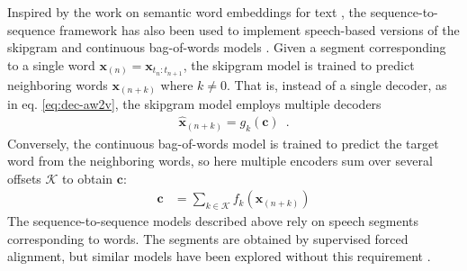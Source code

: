 
%

Inspired by the work on semantic word embeddings for text \cite{mikolov2013distributed}, the sequence-to-sequence framework has also been used to implement speech-based versions of the skipgram and continuous bag-of-words models \cite{chung2017learning, chung2018speech2vec}. Given a segment corresponding to a single word $\mathbf{x}_{(n)} = \mathbf{x}_{t_{n}:t_{n+1}}$, the skipgram model is trained to predict neighboring words $\mathbf{x}_{(n + k)}$ where $k\ne0$. That is, instead of a single decoder, as in eq. \ref{eq:dec-aw2v}, the skipgram model employs multiple decoders
%
\begin{align}
    \hat{\mathbf{x}}_{(n + k)} = g_k(\mathbf{c})\enspace.
\end{align}
%
Conversely, the continuous bag-of-words model is trained to predict the target word from the neighboring words, so here multiple encoders sum over several offsets $\mathcal{K}$ to obtain $\mathbf{c}$:
%
\begin{align}
    \mathbf{c} &= \sum_{k\in\mathcal{K}} f_k(\mathbf{x}_{(n + k)}) %
\end{align}
The sequence-to-sequence models described above rely on speech segments corresponding to words. The segments are obtained by supervised forced alignment, %
but similar models have been explored without this requirement \cite{jati2017speaker2vec, tagliasacchi2020pre}.

